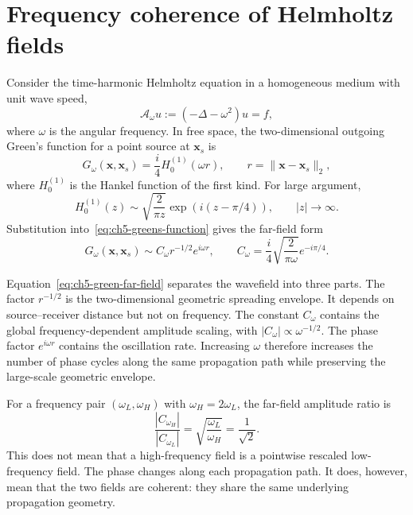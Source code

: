 \section{Frequency coherence of Helmholtz fields}
\label{sec:ch5-frequency-coherence}

Consider the time-harmonic Helmholtz equation in a homogeneous medium with
unit wave speed,
\begin{equation}
    \mathcal{A}_\omega u
    :=
    \left(-\Delta - \omega^2\right)u
    =
    f,
    \label{eq:ch5-helmholtz-continuous}
\end{equation}
where $\omega$ is the angular frequency. In free space, the two-dimensional
outgoing Green's function for a point source at $\mathbf{x}_s$ is
\begin{equation}
    G_\omega(\mathbf{x},\mathbf{x}_s)
    =
    \frac{i}{4} H_0^{(1)}(\omega r),
    \qquad
    r = \|\mathbf{x}-\mathbf{x}_s\|_2,
    \label{eq:ch5-greens-function}
\end{equation}
where $H_0^{(1)}$ is the Hankel function of the first kind. For large argument,
\begin{equation}
    H_0^{(1)}(z)
    \sim
    \sqrt{\frac{2}{\pi z}}
    \exp\!\left(i(z-\pi/4)\right),
    \qquad |z|\rightarrow\infty.
    \label{eq:ch5-hankel-asymptotic}
\end{equation}
Substitution into~\eqref{eq:ch5-greens-function} gives the far-field form
\begin{equation}
    G_\omega(\mathbf{x},\mathbf{x}_s)
    \sim
    C_\omega r^{-1/2} e^{i\omega r},
    \qquad
    C_\omega = \frac{i}{4}\sqrt{\frac{2}{\pi\omega}}e^{-i\pi/4}.
    \label{eq:ch5-green-far-field}
\end{equation}

Equation~\eqref{eq:ch5-green-far-field} separates the wavefield into three
parts. The factor $r^{-1/2}$ is the two-dimensional geometric spreading
envelope. It depends on source--receiver distance but not on frequency. The
constant $C_\omega$ contains the global frequency-dependent amplitude scaling,
with $|C_\omega|\propto \omega^{-1/2}$. The phase factor $e^{i\omega r}$
contains the oscillation rate. Increasing $\omega$ therefore increases the
number of phase cycles along the same propagation path while preserving the
large-scale geometric envelope.

For a frequency pair $(\omega_L,\omega_H)$ with $\omega_H=2\omega_L$, the
far-field amplitude ratio is
\begin{equation}
    \frac{|C_{\omega_H}|}{|C_{\omega_L}|}
    =
    \sqrt{\frac{\omega_L}{\omega_H}}
    =
    \frac{1}{\sqrt{2}}.
    \label{eq:ch5-amplitude-ratio}
\end{equation}
This does not mean that a high-frequency field is a pointwise rescaled
low-frequency field. The phase changes along each propagation path. It does,
however, mean that the two fields are coherent: they share the same underlying
propagation geometry.

